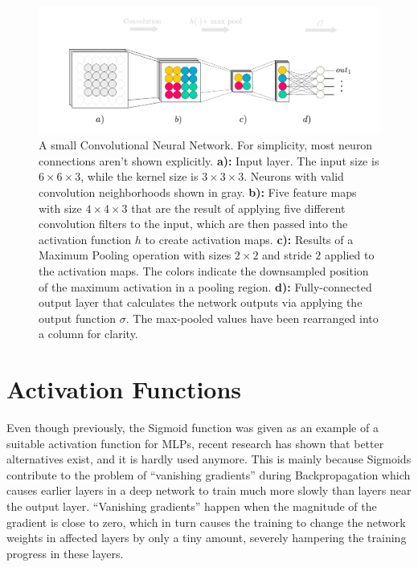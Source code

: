 \begin {figure}[!ht]
	\begin{flushleft}
		\includegraphics[scale=0.75]{img/fig_convnet}
	\end{flushleft}
	\caption{A small Convolutional Neural Network. For simplicity, most neuron connections aren't shown explicitly. \textbf{a):} Input layer. The input size is $6 \times 6 \times 3$, while the kernel size is $3 \times 3 \times 3$. Neurons with valid convolution neighborhoods shown in gray. \textbf{b):} Five feature maps with size $4 \times 4 \times 3$ that are the result of applying five different convolution filters to the input, which are then passed into the activation function $h$ to create activation maps. \textbf{c):} Results of a Maximum Pooling operation with sizes $2 \times 2$ and stride $2$ applied to the activation maps. The colors indicate the downsampled position of the maximum activation in a pooling region. \textbf{d):} Fully-connected output layer that calculates the network outputs via applying the output function $\sigma$. The max-pooled values have been rearranged into a column for clarity.}
	\label{fig:convnet}
\end {figure}


	\section {Activation Functions}
Even though previously, the Sigmoid function was given as an example of a suitable activation function for MLPs, recent research \cite{glorot, rectifiers} has shown that better alternatives exist, and it is hardly used anymore. This is mainly because Sigmoids contribute to the problem of ``vanishing gradients'' during Backpropagation which causes earlier layers in a deep network to train much more slowly than layers near the output layer. ``Vanishing gradients'' happen when the magnitude of the gradient is close to zero, which in turn causes the training to change the network weights in affected layers by only a tiny amount, severely hampering the training progress in these layers.

